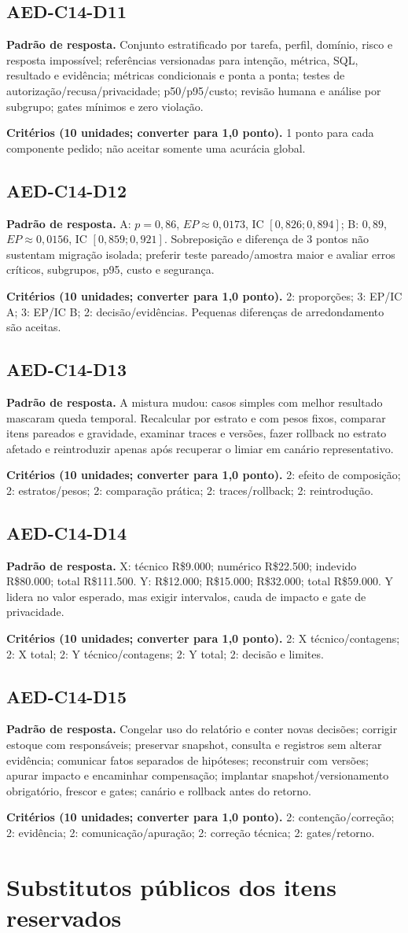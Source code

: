 \documentclass[10pt,a4paper]{article}
\newcommand{\Disc}[3]{\subsection*{#1}\textbf{Padrão de resposta.} #2\par\smallskip\textbf{Critérios (10 unidades; converter para 1,0 ponto).} #3}
\begin{document}
\Disc{AED-C14-D11}{Conjunto estratificado por tarefa, perfil, domínio, risco e resposta impossível; referências versionadas para intenção, métrica, SQL, resultado e evidência; métricas condicionais e ponta a ponta; testes de autorização/recusa/privacidade; p50/p95/custo; revisão humana e análise por subgrupo; gates mínimos e zero violação.}{1 ponto para cada componente pedido; não aceitar somente uma acurácia global.}
\Disc{AED-C14-D12}{A: $p=0{,}86$, $EP\approx0{,}0173$, IC $[0{,}826;0{,}894]$; B: $0{,}89$, $EP\approx0{,}0156$, IC $[0{,}859;0{,}921]$. Sobreposição e diferença de 3 pontos não sustentam migração isolada; preferir teste pareado/amostra maior e avaliar erros críticos, subgrupos, p95, custo e segurança.}{2: proporções; 3: EP/IC A; 3: EP/IC B; 2: decisão/evidências. Pequenas diferenças de arredondamento são aceitas.}
\Disc{AED-C14-D13}{A mistura mudou: casos simples com melhor resultado mascaram queda temporal. Recalcular por estrato e com pesos fixos, comparar itens pareados e gravidade, examinar traces e versões, fazer rollback no estrato afetado e reintroduzir apenas após recuperar o limiar em canário representativo.}{2: efeito de composição; 2: estratos/pesos; 2: comparação prática; 2: traces/rollback; 2: reintrodução.}
\Disc{AED-C14-D14}{X: técnico R\$9.000; numérico R\$22.500; indevido R\$80.000; total R\$111.500. Y: R\$12.000; R\$15.000; R\$32.000; total R\$59.000. Y lidera no valor esperado, mas exigir intervalos, cauda de impacto e gate de privacidade.}{2: X técnico/contagens; 2: X total; 2: Y técnico/contagens; 2: Y total; 2: decisão e limites.}
\Disc{AED-C14-D15}{Congelar uso do relatório e conter novas decisões; corrigir estoque com responsáveis; preservar snapshot, consulta e registros sem alterar evidência; comunicar fatos separados de hipóteses; reconstruir com versões; apurar impacto e encaminhar compensação; implantar snapshot/versionamento obrigatório, frescor e gates; canário e rollback antes do retorno.}{2: contenção/correção; 2: evidência; 2: comunicação/apuração; 2: correção técnica; 2: gates/retorno.}

\section{Substitutos públicos dos itens reservados}
\end{document}
